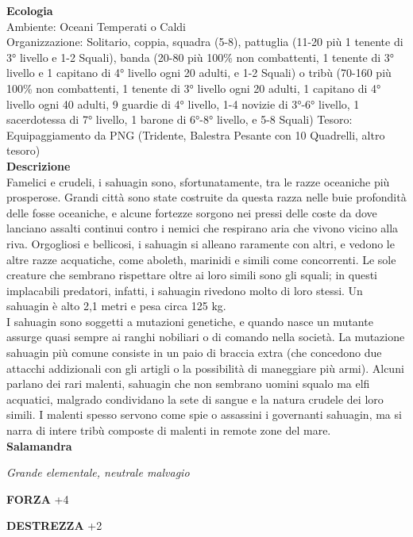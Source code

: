 \begin{multicols}{2}
\textbf{Ecologia}\\
Ambiente: Oceani Temperati o Caldi\\
Organizzazione: Solitario, coppia, squadra (5-8), pattuglia (11-20 più 1 tenente di 3° livello e 1-2 Squali), banda (20-80 più 100\% non combattenti, 1 tenente di 3° livello e 1 capitano di 4° livello ogni 20 adulti, e 1-2 Squali) o tribù (70-160 più 100\% non combattenti, 1 tenente di 3° livello ogni 20 adulti, 1 capitano di 4° livello ogni 40 adulti, 9 guardie di 4° livello, 1-4 novizie di 3°-6° livello, 1 sacerdotessa di 7° livello, 1 barone di 6°-8° livello, e 5-8 Squali)
Tesoro: Equipaggiamento da PNG (Tridente, Balestra Pesante con 10 Quadrelli, altro tesoro)\\
\textbf{Descrizione}\\
Famelici e crudeli, i sahuagin sono, sfortunatamente, tra le razze oceaniche più prosperose. Grandi città sono state costruite da questa razza nelle buie profondità delle fosse oceaniche, e alcune fortezze sorgono nei pressi delle coste da dove lanciano assalti continui contro i nemici che respirano aria che vivono vicino alla riva. Orgogliosi e bellicosi, i sahuagin si alleano raramente con altri, e vedono le altre razze acquatiche, come aboleth, marinidi e simili come concorrenti. Le sole creature che sembrano rispettare oltre ai loro simili sono gli squali; in questi implacabili predatori, infatti, i sahuagin rivedono molto di loro stessi. Un sahuagin è alto 2,1 metri e pesa circa 125 kg.\\

I sahuagin sono soggetti a mutazioni genetiche, e quando nasce un mutante assurge quasi sempre ai ranghi nobiliari o di comando nella società. La mutazione sahuagin più comune consiste in un paio di braccia extra (che concedono due attacchi addizionali con gli artigli o la possibilità di maneggiare più armi). Alcuni parlano dei rari malenti, sahuagin che non sembrano uomini squalo ma elfi acquatici, malgrado condividano la sete di sangue e la natura crudele dei loro simili. I malenti spesso servono come spie o assassini i governanti sahuagin, ma si narra di intere tribù composte di malenti in remote zone del mare.\\


\medskip{}\textbf{Salamandra}

\emph{Grande elementale, neutrale malvagio}

\textbf{FORZA} +4

\textbf{DESTREZZA} +2


\end{multicols}
